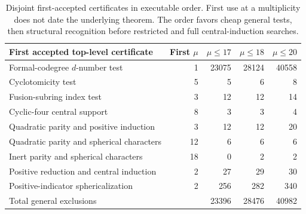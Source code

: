 \begin{table}[ht]\centering\small
\begin{tabular}{lrrrr}\toprule
First accepted top-level certificate&First $\mu$&$\mu\le17$&$\mu\le18$&$\mu\le20$\\\midrule
Formal-codegree $d$-number test&1&23075&28124&40558\\
Cyclotomicity test&5&5&6&8\\
Fusion-subring index test&3&12&12&14\\
Cyclic-four central support&8&3&3&4\\
Quadratic parity and positive induction&3&12&12&20\\
Quadratic parity and spherical characters&12&6&6&6\\
Inert parity and spherical characters&18&0&2&2\\
Positive reduction and central induction&2&27&29&30\\
Positive-indicator sphericalization&2&256&282&340\\
\midrule Total general exclusions&&23396&28476&40982\\
\bottomrule\end{tabular}
\caption{Disjoint first-accepted certificates in executable order. First use at a multiplicity does not date the underlying theorem. The order favors cheap general tests, then structural recognition before restricted and full central-induction searches.}\label{tab:allocation}\end{table}
